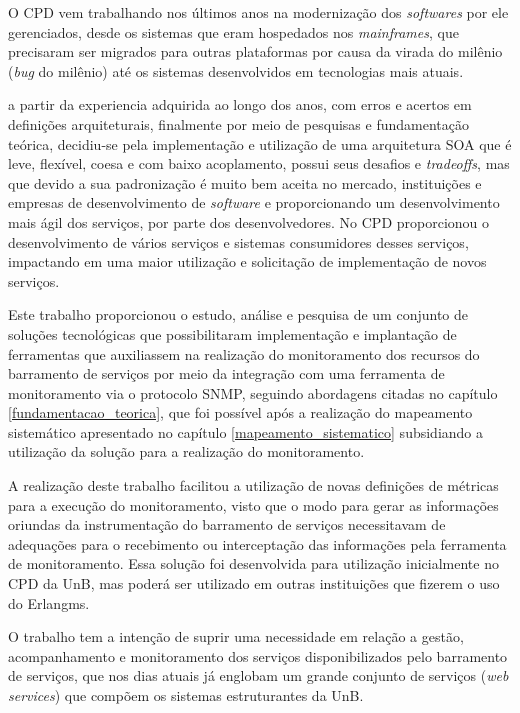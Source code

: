 \label{conclusao}

O \acrshort{CPD} vem trabalhando nos últimos anos na modernização dos \textit{softwares} por ele gerenciados, desde os sistemas que eram hospedados nos \textit{mainframes}, que precisaram ser migrados para outras plataformas por causa da virada do milênio (\textit{bug} do milênio) até os sistemas desenvolvidos em tecnologias mais atuais. 

a partir da experiencia adquirida ao longo dos anos, com erros e acertos em definições arquiteturais, finalmente por meio de pesquisas e fundamentação teórica, decidiu-se pela implementação e utilização de uma arquitetura \acrshort{SOA} que é leve, flexível, coesa e com baixo acoplamento, possui seus desafios e \textit{tradeoffs}, mas que devido a sua padronização é muito bem aceita no mercado, instituições e empresas de desenvolvimento de \textit{software} e proporcionando um desenvolvimento mais ágil dos serviços, por parte dos desenvolvedores. No \acrshort{CPD} proporcionou o desenvolvimento de vários serviços e sistemas consumidores desses serviços, impactando em uma maior utilização e solicitação de implementação de novos serviços.      

Este trabalho proporcionou o estudo, análise e pesquisa de um conjunto de soluções tecnológicas que possibilitaram implementação e implantação de ferramentas que auxiliassem na realização do monitoramento dos recursos do barramento de serviços por meio da integração com uma ferramenta de monitoramento via o protocolo \acrshort{SNMP}, seguindo  abordagens citadas no capítulo \ref{fundamentacao_teorica}, que foi possível após a realização do mapeamento sistemático apresentado no capítulo \ref{mapeamento_sistematico} subsidiando a utilização da solução para a realização do monitoramento.  

 A realização deste trabalho facilitou a utilização de novas definições de métricas para a execução do monitoramento, visto que o modo para gerar as informações oriundas da instrumentação do barramento de serviços necessitavam de adequações para o recebimento ou interceptação das informações pela ferramenta de monitoramento. Essa solução foi desenvolvida para utilização inicialmente no \acrshort{CPD} da \acrshort{UnB}, mas poderá ser utilizado em outras instituições que fizerem o uso do Erlangms. 

O trabalho tem a intenção de suprir uma necessidade em relação a gestão, acompanhamento e monitoramento dos serviços disponibilizados pelo barramento de serviços, que nos dias atuais já englobam um grande conjunto de serviços (\textit{web services}) que compõem os sistemas estruturantes da \acrshort{UnB}.


